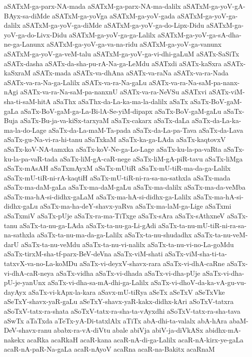 {aSATxM-ga-parx-NA-mada
aSATxM-ga-parx-NA-ma-dalilx
aSATxM-ga-yoV-gA-BAyx-sa-diMde
aSATxM-ga-yoVga
aSATxM-ga-yoV-gada
aSATxM-ga-yoV-ga-dalilx
aSATxM-ga-yoV-ga-diMde
aSATxM-ga-yoV-ga-do-Lipx-Didu
aSATxM-ga-yoV-ga-do-Livx-Didu
aSATxM-ga-yoV-ga-ga-Lalilx
aSATxM-ga-yoV-ga-sA-dha-ne-ga-Lanunx
aSATxM-ga-yoV-ga-va-na-ridu
aSATxM-ga-yoV-ga-vanunx
aSATxM-ga-yoV-ga-veM-talu
aSATxM-ga-yoV-ga-vi-dhi-gaLuM
aSATx-SaSiTx
aSATx-dasha
aSATx-da-sha-pu-rA-Na-ga-LeMdu
aSATxdi
aSATx-kaSxra
aSATx-kaSxraM
aSATx-mada
aSATx-va-dhAna
aSATx-va-raNa
aSATx-va-ra-Nada
aSATx-va-ra-Na-ga-Lalilx
aSATx-va-ra-Na-gaLu
aSATx-va-ra-Na-saM-pa-nanx-nAgi
aSATx-va-ra-Na-saM-pa-nanxnU
aSATx-va-ra-NeVSu
aSATxvi
aSATx-viM-sha-ti-saM-hitA
aSaThx
aSaThx-da-La-ka-ma-la-dalilx
aSaTx
aSaTx-BoV-gaM-gaLa
aSaTx-BoV-gaM-ga-La-Bi-lA-Se-yiM-dipapx
aSaTx-BoV-gaM-gaLu
aSaTx-Buja
aSaTx-Bu-ja-va-kiSx-tarxyaM
aSaTx-cakarx
aSaTx-daLa
aSaTx-da-La-ka-ma-la-do-Lage
aSaTx-da-La-maM-Ta-pada
aSaTx-da-La-pa-Tava
aSaTx-da-Lava
aSaTx-gu-Na-vi-ra-hi-tanu
aSaTxkaM
aSaTx-ka-ga-LAda
aSaTx-kaqtovxV
aSaTx-koV-NA-tamxka
aSaTx-koV-Ne-ga-Lo-Lage
aSaTx-ku-la-pa-vaRta
aSaTx-ku-la-pa-vaR-tada
aSaTx-liM-gA-caR-nege
aSaTx-liM-gA-piR-tavu
aSaTx-liMga
aSaTx-mAsAH
aSaTxmAyxM
aSaTx-mUtiR
aSaTx-mU-tiR-ma-da-ga-Lalilx
aSaTx-mU-tiR-ni-rA-kaqtiH
aSaTx-mU-tiR-ni-ra-sa-na-sathxla
aSaTx-mada
aSaTx-ma-daM-gaLa
aSaTx-ma-daM-gaLu
aSaTx-ma-dalilx
aSaTx-ma-da-veMba
aSaTx-ma-hA-si-didhx-gaLaM
aSaTx-ma-hA-si-didhx-ga-Lalilx
aSaTx-ma-hA-si-didhx-gaLu
aSaTx-ma-ha-deY-shavx-yaRva
aSaTx-ma-laM-ga-Lige
aSaTxmi
aSaTxmiV
aSaTx-pUje
aSaTx-ra-ma-TiTxge
aSaTx-sAra
aSaTx-sAthxneV
aSaTx-tanu
aSaTx-ta-nu-ga-LAda
aSaTx-ta-nu-ga-Li-gAdi
aSaTx-ta-nu-mU-tiR-ni-ra-sa-na-sathxla
aSaTx-ta-nu-ma-da-ga-Lalilx
aSaTx-ta-nu-shudadhx
aSaTx-ta-nu-veM-darU
aSaTx-ta-nu-veMdu
aSaTx-ta-nu-vi-nalilx
aSaTx-ta-nu-vi-no-La-goMdu
aSaTx-tirxM-sha-tf-parx-BeV-deVna
aSaTx-viM-shati
aSaTx-viM-sha-ti-ta-tatxvX-va-no-La-koMDu
aSaTx-vi-deyxV-shavx-rara
aSaTx-vi-dhA-caRne
aSaTx-vi-dhA-caR-neya
aSaTx-vidha
aSaTx-vi-dhada
aSaTx-vi-dha-pUje
aSaTx-vi-dha-pU-je-yanUnx
aSaTx-vi-dha-sa-mA-dhi-ga-Lalilx
aSaTx-vi-dhoV-da-ka-vA-gu-vu-dayAyx
aSaTx-vi-kApx-la-kara
aSavx-mU-tiRya
aSeTx
aSeTxV
aSeTxVke
aSeTxY-shavx-yaR-gaLu
aSeTxY-shavx-yaR-kakx-didhx-kAri
aSoTxV-tatxra
aSoTxV-tatx-ra-shata
aSoTxV-tatx-ra-sha-ta-vAyxdhi
aSoTxV-tatx-ra-sha-tava
aSwTx
aTaTxda
aTeTx-yA-Di-tatxlAlx
aTiTx
abA-dhi-ta-valalx
abA-hAra
abaM-DeV-shavx-ranu
ababx-ra-vA-diVtu
abale
abiVja
abiV-ja-diVkASx
abidhx-mA-nakekx
acaRka
acaRkaH
acaR-kana
acaR-nA-di-ga-Lalilx
acaR-nA-kirx-ye-gaLa
acaR-nA-paR-Na-gaLa
acaR-nAyoV
acaRna
acaR-na-Bakitx
acaRnaM
}
